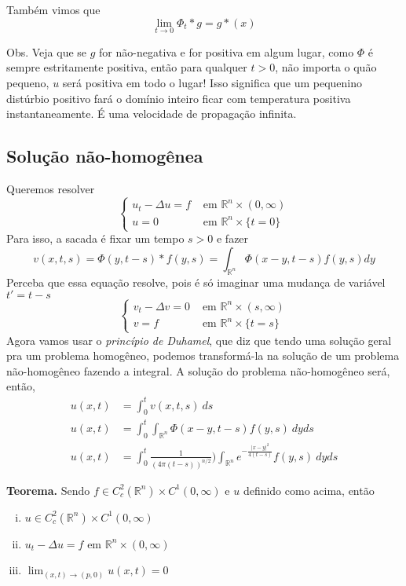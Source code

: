 \documentclass[11pt]{article}
\newcommand{\Rn}{{\mathbb{R}^n}}
\begin{document}
	Também vimos que \[\lim_{t\rightarrow 0} \Phi_t * g = g*(x)\]
	
	Obs. Veja que se \(g\) for não-negativa e for positiva em algum lugar, como \(\Phi\) é sempre estritamente positiva, então para qualquer \(t>0\), não importa o quão pequeno, \(u\) será positiva em todo o lugar! Isso significa que um pequenino distúrbio positivo fará o domínio inteiro ficar com temperatura positiva instantaneamente. É uma velocidade de propagação infinita.
	

\subsection*{Solução não-homogênea}
Queremos resolver \[\begin{cases}
	u_t - \Delta u = f & \text{ em } \Rn \times (0, \infty) \\
	u = 0 & \text{ em } \Rn \times \{t=0\}
\end{cases}\] Para isso, a sacada é fixar um tempo \(s>0\) e fazer \[v(x,t,s)=\Phi(y,t-s)*f(y,s) = \int_\Rn \Phi(x-y,t-s) f(y,s) dy\] Perceba que essa equação resolve, pois é só imaginar uma mudança de variável \(t' = t-s\) \[\begin{cases}
v_t - \Delta v = 0 & \text{ em } \Rn \times (s, \infty) \\
v = f & \text{ em } \Rn \times \{t=s\}
\end{cases}\]
Agora vamos usar o \textit{princípio de Duhamel}, que diz que tendo uma solução geral pra um problema homogêneo, podemos transformá-la na solução de um problema não-homogêneo fazendo a integral. A solução do problema não-homogêneo será, então, \begin{align*}
	u(x,t)&= \int_0^t v(x,t,s)\ ds \\
	u(x,t)&=\int_0^t \int_\Rn \Phi(x-y,t-s) f(y,s)\ dy ds \\
	u(x,t) &=\int_0^t \frac{1}{(4\pi(t-s))^{n/2}})\int_\Rn e^{-\frac{|x-y|^2}{4(t-s)}}f(y,s)\ dyds 
\end{align*} 

\textbf{Teorema.} Sendo \(f\in C^2_c(\Rn)\times C^1(0,\infty)\) e \(u\) definido como acima, então \begin{enumerate}[(i)]
	\item \(u\in  C^2_c(\Rn)\times C^1(0,\infty)\)
	\item \(u_t - \Delta u = f\) em \(  \Rn \times (0, \infty) \)
	\item \(\lim_{(x,t)\rightarrow(p,0)} u(x,t) = 0\)
\end{enumerate}
\end{document}
